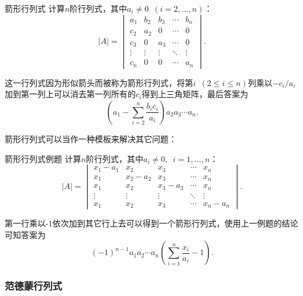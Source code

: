 \begin{example}{箭形行列式}{}
    计算$n$阶行列式，其中$a_i\neq 0\enspace(i=2,\ldots,n)$：
    \[|A|=\begin{vmatrix}
            a_1    & b_2    & b_3    & \cdots & b_n    \\
            c_2    & a_2    & 0      & \cdots & 0      \\
            c_3    & 0      & a_3    & \cdots & 0      \\
            \vdots & \vdots & \vdots & \ddots & \vdots \\
            c_n    & 0      & 0      & \cdots & a_n
        \end{vmatrix}.\]
\end{example}

\begin{solution}
    这一行列式因为形似箭头而被称为箭形行列式，将第$i\enspace(2\leqslant i\leqslant n)$列乘以$-c_i/a_i$加到第一列上可以消去第一列所有的$c_i$得到上三角矩阵，最后答案为
    \[
    (a_1-\sum\limits_{i=2}^n\dfrac{b_ic_i}{a_i})a_2a_3\cdots a_n.
    \]
\end{solution}

箭形行列式可以当作一种模板来解决其它问题：

\begin{example}{}{箭形行列式例题}
    计算$n$阶行列式，其中$a_i\neq 0,\enspace i=1,\ldots,n$：
    \[|A|=\begin{vmatrix}
            x_1-a_1 & x_2     & x_3     & \cdots & x_n     \\
            x_1     & x_2-a_2 & x_3     & \cdots & x_n     \\
            x_1     & x_2     & x_3-a_3 & \cdots & x_n     \\
            \vdots  & \vdots  & \vdots  & \ddots & \vdots  \\
            x_1     & x_2     & x_3     & \cdots & x_n-a_n
        \end{vmatrix}.\]
\end{example}

\begin{solution}
    第一行乘以-1依次加到其它行上去可以得到一个箭形行列式，使用上一例题的结论可知答案为\[(-1)^{n-1}a_1a_2\cdots a_n(\sum\limits_{i=1}^n\dfrac{x_i}{a_i}-1).\]
\end{solution}

\subsubsection{范德蒙行列式}

